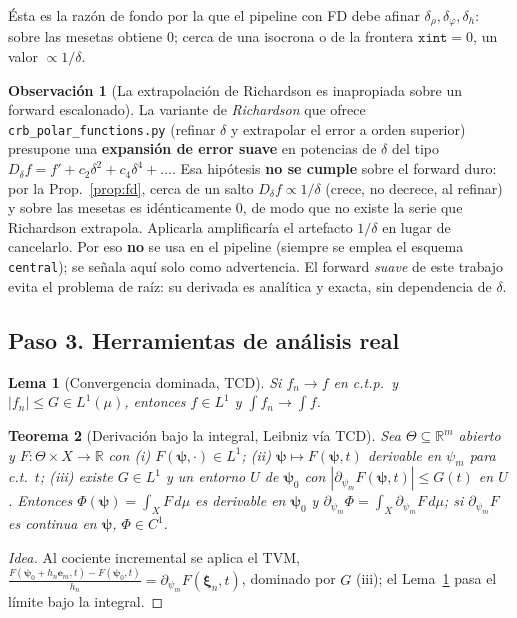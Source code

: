 \documentclass[11pt,a4paper]{article}
\theoremstyle{plain}
\newtheorem{theorem}{Teorema}
\newtheorem{lemma}[theorem]{Lema}
\theoremstyle{definition}
\newtheorem{remark}{Observaci\'on}
\newcommand{\vect}[1]{\boldsymbol{#1}}
\newcommand{\R}{\mathbb{R}}
\newcommand{\abs}[1]{\left\lvert #1 \right\rvert}
\begin{document}
\'Esta es la raz\'on de fondo por la que el pipeline con FD debe afinar
$\delta_\rho,\delta_\varphi,\delta_h$: sobre las mesetas obtiene $0$; cerca de una
isocrona o de la frontera $\texttt{xint}=0$, un valor $\propto1/\delta$.

\begin{remark}[La extrapolaci\'on de Richardson es inapropiada sobre un forward escalonado]
La variante de \emph{Richardson} que ofrece \texttt{crb\_polar\_functions.py}
(refinar $\delta$ y extrapolar el error a orden superior) presupone una
\textbf{expansi\'on de error suave} en potencias de $\delta$ del tipo
$D_\delta f = f' + c_2\delta^2 + c_4\delta^4 + \dots$. Esa hip\'otesis
\textbf{no se cumple} sobre el forward duro: por la Prop.~\ref{prop:fd}, cerca de
un salto $D_\delta f\propto1/\delta$ (crece, no decrece, al refinar) y sobre las
mesetas es id\'enticamente $0$, de modo que no existe la serie que Richardson
extrapola. Aplicarla amplificar\'ia el artefacto $1/\delta$ en lugar de
cancelarlo. Por eso \textbf{no} se usa en el pipeline (siempre se emplea el
esquema \texttt{central}); se se\~nala aqu\'i solo como advertencia. El forward
\emph{suave} de este trabajo evita el problema de ra\'iz: su derivada es
anal\'itica y exacta, sin dependencia de $\delta$.
\end{remark}

\subsection*{Paso 3. Herramientas de an\'alisis real}
\label{sec:herramientas}

\begin{lemma}[Convergencia dominada, TCD]\label{lem:tcd}
Si $f_n\to f$ en c.t.p.\ y $\abs{f_n}\le G\in L^1(\mu)$, entonces $f\in L^1$ y
$\int f_n\to\int f$.
\end{lemma}

\begin{theorem}[Derivaci\'on bajo la integral, Leibniz v\'ia TCD]\label{thm:leibniz}
Sea $\Theta\subseteq\R^m$ abierto y $F:\Theta\times X\to\R$ con (i)
$F(\vect{\psi},\cdot)\in L^1$; (ii) $\vect{\psi}\mapsto F(\vect{\psi},t)$
derivable en $\psi_m$ para c.t.\ $t$; (iii) existe $G\in L^1$ y un entorno $U$ de
$\vect{\psi}_0$ con $\abs{\partial_{\psi_m}F(\vect{\psi},t)}\le G(t)$ en $U$.
Entonces $\Phi(\vect{\psi})=\int_X F\,d\mu$ es derivable en $\vect{\psi}_0$ y
$\partial_{\psi_m}\Phi=\int_X\partial_{\psi_m}F\,d\mu$; si $\partial_{\psi_m}F$ es
continua en $\vect{\psi}$, $\Phi\in C^1$.
\end{theorem}
\begin{proof}[Idea]
Al cociente incremental se aplica el TVM,
$\frac{F(\vect{\psi}_0+h_n\vect e_m,t)-F(\vect{\psi}_0,t)}{h_n}
=\partial_{\psi_m}F(\vect{\xi}_n,t)$, dominado por $G$ (iii); el
Lema~\ref{lem:tcd} pasa el l\'imite bajo la integral.
\end{proof}
\end{document}
